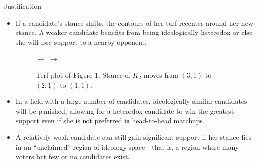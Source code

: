 \documentclass{article}
\begin{document}
\begin{section}{Justification}
\begin{itemize}
\item If a candidate's stance shifts, the contours of her turf recenter around her new stance. A weaker candidate benefits from being ideologically heterodox or else she will lose support to a nearby opponent.
\begin{figure}[!h]
 $\rightarrow$
 $\rightarrow$
\caption{Turf plot of Figure 1. Stance of $K_2$ moves from $(3,1)$ to $(2,1)$ to $(1,1)$.}
\end{figure}
\item In a field with a large number of candidates, ideologically similar candidates will be punished, allowing for a heterodox candidate to win the greatest support even if she is not preferred in head-to-head matchups.
\item A relatively weak candidate can still gain significant support if her stance lies in an ``unclaimed'' region of ideology space---that is, a region where many voters but few or no candidates exist.
\end{itemize}

\end{section}
\end{document}
